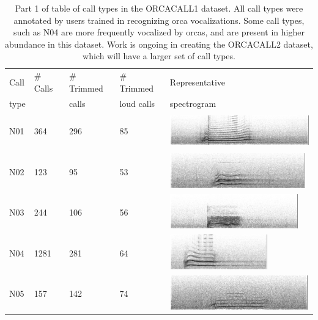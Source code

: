 \begin{table}
\begin{tabular}{|l|l|l|l|l|}
\hline
Call     &  \# Calls  & \# Trimmed & \# Trimmed         &  Representative  \\
type     &            & calls      & loud calls         &    spectrogram    \\
\hline
 N01     &  364       &  296  &   85                &   \includegraphics[height=1.5cm] {figures/catalog/A36-N01-062802-D004-12218.png} \\ \hline
 N02     &  123       &   95  &   53                &   \includegraphics[height=1.5cm] {figures/catalog/A36-N02-063002-D005-10750.png} \\ \hline
 N03     &  244       &  106  &   56                &   \includegraphics[height=1.5cm] {figures/catalog/A36-N03-071506-D017-10139.png} \\ \hline
 N04     &  1281      &  281  &   64                &   \includegraphics[height=1.5cm]  {figures/catalog/A36-N04-063002-D005-10843.png} \\ \hline
 N05     &  157       &  142  &   74                &   \includegraphics[height=1.5cm] {figures/catalog/A35-N05-070606-D011-04146.png} \\ \hline
\end{tabular}
\caption{Part 1 of table of call types in the ORCACALL1 dataset.  All call types were
  annotated by users trained in recognizing orca vocalizations.  Some
  call types, such as N04 are more frequently vocalized by orcas, and are
  present in higher abundance in this dataset.  Work is ongoing in
  creating the ORCACALL2 dataset, which will have a larger set of
  call types.}
\label{table:calls-table}
\end{table}

